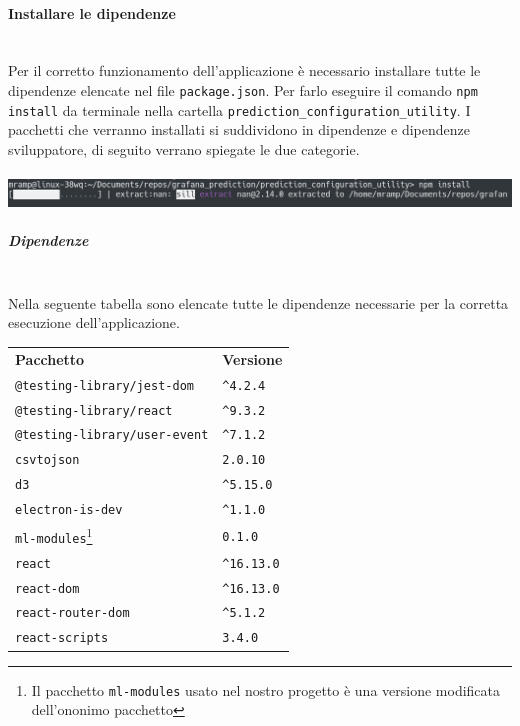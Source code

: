 \paragraph{Installare le dipendenze}\mbox{}\\ [1mm]
Per il corretto funzionamento dell'applicazione è necessario installare tutte le dipendenze elencate nel file \texttt{package.json}. Per farlo eseguire il comando \texttt{npm install} da terminale nella cartella \verb|prediction_configuration_utility|. I pacchetti che verranno installati si suddividono in dipendenze e dipendenze sviluppatore, di seguito verrano spiegate le due categorie.
\\
\\
\includegraphics[width=\textwidth,height=\textheight,keepaspectratio]{img/packageInstallation.png}

\subparagraph*{Dipendenze}\mbox{}\\ [1mm]
Nella seguente tabella sono elencate tutte le dipendenze necessarie per la corretta esecuzione dell'applicazione.
	\setcounter{table}{0}
	\begin{longtable} {
		>{}p{65mm} 
		>{}p{30mm}
		}
    \rowcolor{gray!50}
    \textbf{Pacchetto} & \textbf{Versione} \TBstrut \\ [2mm]
    \verb|@testing-library/jest-dom| & \verb|^4.2.4|  \TBstrut \\ [2mm]
    \verb|@testing-library/react| & \verb|^9.3.2| \TBstrut \\ [2mm]
    \verb|@testing-library/user-event| & \verb|^7.1.2| \TBstrut \\ [2mm]
    \verb|csvtojson| & \verb|2.0.10| \TBstrut \\ [2mm]
    \verb|d3| & \verb|^5.15.0| \TBstrut \\ [2mm]
    \verb|electron-is-dev| & \verb|^1.1.0| \TBstrut \\ [2mm]
    \verb|ml-modules|\footnote{Il pacchetto \texttt{ml-modules} usato nel nostro progetto è una versione modificata dell'ononimo pacchetto} & \verb|0.1.0| \TBstrut \\ [2mm]
    \verb|react| & \verb|^16.13.0| \TBstrut \\ [2mm]
    \verb|react-dom| & \verb|^16.13.0| \TBstrut \\ [2mm]
    \verb|react-router-dom| & \verb|^5.1.2| \TBstrut \\ [2mm]
    \verb|react-scripts| & \verb|3.4.0| \TBstrut \\ [2mm]
    \end{longtable}
    
